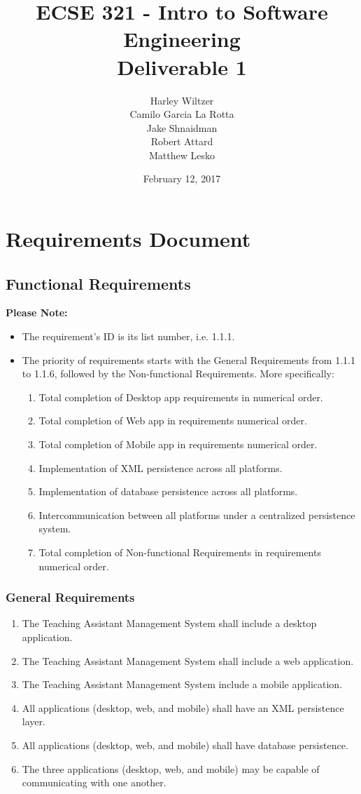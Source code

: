 \documentclass[12pt]{report}
\title{ECSE 321 - Intro to Software Engineering\\Deliverable 1}
\author{Harley Wiltzer\\Camilo Garcia La Rotta\\Jake Shnaidman\\Robert Attard\\Matthew Lesko}
\date{February 12, 2017}
\begin{document}
\maketitle
\newpage
{} %
\tableofcontents
\chapter{Requirements Document}
\section{Functional Requirements}
\textbf{Please Note:}
\begin{itemize}
    \item The requirement's ID is its list number, i.e. 1.1.1.
    \item The priority of requirements starts with the General Requirements from 1.1.1 to 1.1.6, followed by the Non-functional Requirements. 
    More specifically:
        \begin{enumerate}
            \item Total completion of Desktop app requirements in numerical order.
            \item Total completion of Web app in requirements numerical order.
            \item Total completion of Mobile app in requirements numerical order.
            \item Implementation of XML persistence across all platforms.
            \item Implementation of database persistence across all platforms.
            \item Intercommunication between all platforms under a centralized persistence system.
            \item Total completion of Non-functional Requirements in requirements numerical order.
        \end{enumerate} 
\end{itemize}
\subsection{General Requirements}
\begin{enumerate}[\thesubsection .1]
	\item The Teaching Assistant Management System shall include a desktop application.
	\item The Teaching Assistant Management System shall include a web application.
	\item The Teaching Assistant Management System include a mobile application.
	\item All applications (desktop, web, and mobile) shall have an XML persistence layer.
	\item All applications (desktop, web, and mobile) shall have database persistence.
	\item The three applications (desktop, web, and mobile) may be capable of communicating with
		one another.
\end{enumerate}
\end{document}

